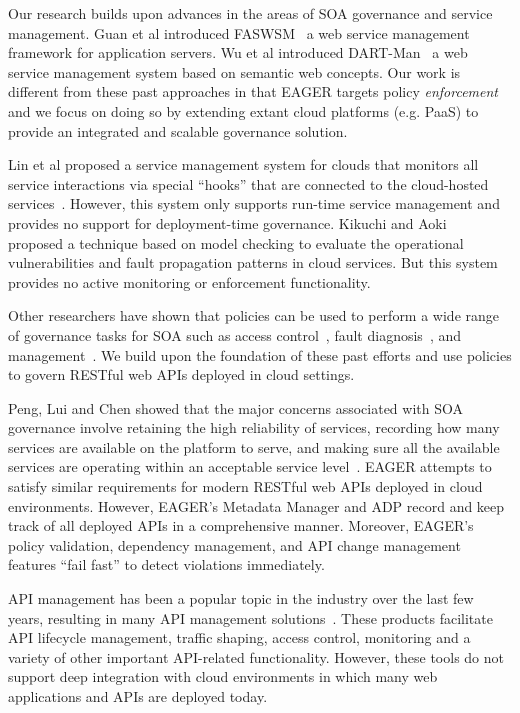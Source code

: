 Our research builds upon advances in the areas of SOA governance and
service management. 
Guan et al introduced FASWSM~\cite{1607141} a web service management
framework for application servers. Wu et al introduced DART-Man~\cite{1504267} a web
service management system based on semantic web concepts. 
Our work is different 
from these past approaches in that EAGER targets policy \textit{enforcement} 
and we focus on doing so by extending extant
cloud platforms (e.g. PaaS) to provide an integrated and scalable governance
solution.

Lin et al proposed a service management system for clouds that monitors all
service interactions via special ``hooks'' that are connected to the
cloud-hosted services~\cite{5616981}. However, this system only supports run-time
service management and provides no support for deployment-time governance. 
Kikuchi and Aoki~\cite{6525502} proposed a technique
based on model checking to evaluate the operational vulnerabilities and fault
propagation patterns in cloud services. But this system provides no
active monitoring or enforcement functionality.

Other researchers have shown that policies can be
used to perform a wide range of governance tasks for SOA such as access
control~\cite{4279630}, fault diagnosis~\cite{6154236},
and management~\cite{Suleiman:2009:IUM:1564601.1564730}. We build
upon the foundation of these past efforts and use policies to govern
RESTful web APIs deployed in cloud settings. 

Peng, Lui and Chen showed that
the major concerns associated with SOA governance 
involve retaining the high reliability of services, recording how many services
are available on the platform to serve, and making sure all the available 
services are operating within an acceptable service
level~\cite{4730489}. EAGER attempts to satisfy similar requirements for 
modern RESTful web APIs deployed in cloud environments. 
However, EAGER's Metadata Manager and ADP record and keep track of all deployed APIs 
in a comprehensive manner.  Moreover, EAGER's policy
validation, dependency management, and API change management features 
``fail fast'' to detect violations immediately.

API management has been a popular topic in the industry over the last few years, resulting
in many API management solutions~\cite{wso2am,apigee}. These products facilitate
API lifecycle management, traffic shaping, access control, monitoring and a variety of other
important API-related functionality. However, these tools do not support deep integration with
cloud environments in which many web applications and APIs are deployed today. 

